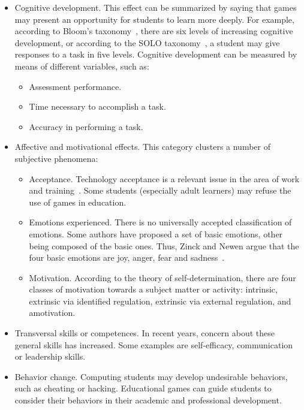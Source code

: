 \documentclass{sig-alternate-05-2015}
\begin{document}
\begin{itemize}
\item Cognitive development. This effect can be summarized by saying that games may present an opportunity for students to learn more deeply. For example, according to Bloom's taxonomy~\cite{anderson01taxonomy}, there are six levels of increasing cognitive development, or according to the SOLO taxonomy~\cite{biggs82evaluating}, a student may give responses to a task in five levels. Cognitive development can be measured by means of different variables, such as:
\begin{itemize}
\item Assessment performance.
\item Time necessary to accomplish a task.
\item Accuracy in performing a task.
\end{itemize}
\item Affective and motivational effects. This category clusters a number of subjective phenomena:
\begin{itemize}
\item Acceptance. Technology acceptance is a relevant issue in the area of work and training~\cite{davis89perceived}. Some students (especially adult learners) may refuse the use of games in education.
\item Emotions experienced. There is no universally accepted classification of emotions. Some authors have proposed a set of basic emotions, other being composed of the basic ones. Thus, Zinck and Newen argue that the four basic emotions are joy, anger, fear and sadness~\cite{zinck08classifying}.
\item Motivation. According to the theory of self-de\-term\-in\-a\-tion, there are four classes of motivation towards a subject matter or activity: intrinsic, extrinsic via identified regulation, extrinsic via external regulation, and amotivation.
\end{itemize}
\item Transversal skills or competences. In recent years, concern about these general skills has increased. Some examples are self-efficacy, communication or leadership skills.
\item Behavior change. Computing students may develop undesirable behaviors, such as cheating or hacking. Educational games can guide students to consider their behaviors in their academic and professional development.
\end{itemize}
\end{document}
